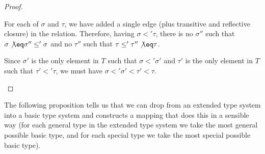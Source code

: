 \documentclass[main.tex]{subfiles}
\begin{document}
\begin{proof}
\begin{itemize}
\begin{itemize}
                    For each of $\sigma$ and $\tau$, we have added a single edge
                    (plus transitive and reflective closure) in the relation.
                    Therefore, having $\sigma \less' \tau$, there is no
                    $\sigma''$ such that $\sigma \not\eq \sigma'' \less' \sigma$
                    and no $\tau''$ such that $\tau \less' \tau'' \not\eq \tau$.

                    Since $\sigma'$ is the only element in $T$ such that
                    $\sigma \less' \sigma'$  and $\tau'$ is the only element in $T$
                    such that $\tau' \less' \tau$, we must have
                    $\sigma \less' \sigma' \less \tau' \less \tau$.
            \end{itemize}
    \end{itemize}
\end{proof}

The following proposition tells us that we can drop from an extended type
system into a basic type system and constructs a mapping that does this in a
sensible way (for each general type in the extended type system we take the
most general possible basic type, and for each special type we take the most
special possible basic type).
\end{document}

